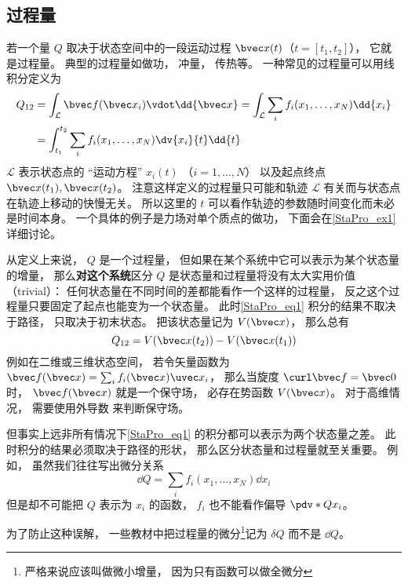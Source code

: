 \subsection{过程量}
若一个量 $Q$ 取决于状态空间中的一段运动过程 $\bvec x(t)$（$t = [t_1,t_2]$）， 它就是过程量。  典型的过程量如做功， 冲量， 传热等。 一种常见的过程量可以用线积分定义为
\begin{equation}\label{StaPro_eq1}
\begin{aligned}
Q_{12} &= \int_{\mathcal L} \bvec f(\bvec x_i) \vdot \dd{\bvec x} = \int_{\mathcal L} \sum_i f_i(x_1, \dots, x_N) \dd{x_i}\\
&= \int_{t_1}^{t_2} \sum_i f_i(x_1, \dots, x_N) \dv{x_i}{t} \dd{t}
\end{aligned}
\end{equation}
$\mathcal L$ 表示状态点的 “运动方程” $x_i(t)$ （$i = 1,\dots, N$） 以及起点终点 $\bvec x(t_1), \bvec x(t_2)$。 注意这样定义的过程量只可能和轨迹 $\mathcal L$ 有关而与状态点在轨迹上移动的快慢无关。 所以这里的 $t$ 可以看作轨迹的参数随时间变化而未必是时间本身。 一个具体的例子是力场对单个质点的做功， 下面会在\autoref{StaPro_ex1} 详细讨论。


从定义上来说， $Q$ 是一个过程量， 但如果在某个系统中它可以表示为某个状态量的增量， 那么\textbf{对这个系统}区分 $Q$ 是状态量和过程量将没有太大实用价值（trivial）： 任何状态量在不同时间的差都能看作一个这样的过程量， 反之这个过程量只要固定了起点也能变为一个状态量。 此时\autoref{StaPro_eq1} 积分的结果不取决于路径， 只取决于初末状态。 把该状态量记为 $V(\bvec x)$， 那么总有
\begin{equation}
Q_{12} = V(\bvec x(t_2)) - V(\bvec x(t_1))
\end{equation}
例如在二维或三维状态空间， 若令矢量函数为 $\bvec f(\bvec x) = \sum_i f_i(\bvec x) \uvec x_i$， 那么当旋度 $\curl \bvec f = \bvec 0$ 时， $\bvec f(\bvec x)$ 就是一个保守场， 必存在势函数 $V(\bvec x)$。 对于高维情况， 需要使用外导数 来判断保守场。

但事实上远非所有情况下\autoref{StaPro_eq1} 的积分都可以表示为两个状态量之差。 此时积分的结果必须取决于路径的形状， 那么区分状态量和过程量就至关重要。 例如， 虽然我们往往写出微分关系
\begin{equation}
\dd Q = \sum_i f_i(x_1, \dots, x_N) \dd{x_i}
\end{equation}
但是却不可能把 $Q$ 表示为 $x_i$ 的函数， $f_i$ 也不能看作偏导 $\pdv*{Q}{x_i}$。

为了防止这种误解， 一些教材中把过程量的微分\footnote{严格来说应该叫做微小增量， 因为只有函数可以做全微分}记为 $\delta Q$ 而不是 $\dd Q$。

